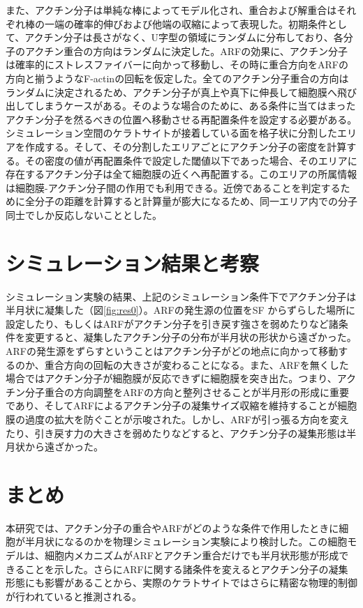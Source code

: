 \documentclass[10pt,twocolumn,a4j]{jarticle}
\begin{document}
また、アクチン分子は単純な棒によってモデル化され、重合および解重合はそれぞれ棒の一端の確率的伸びおよび他端の収縮によって表現した。初期条件として、アクチン分子は長さがなく、U字型の領域にランダムに分布しており、各分子のアクチン重合の方向はランダムに決定した。ARFの効果に、アクチン分子は確率的にストレスファイバーに向かって移動し、その時に重合方向をARFの方向と揃うようなF-actinの回転を仮定した。全てのアクチン分子重合の方向はランダムに決定されるため、アクチン分子が真上や真下に伸長して細胞膜へ飛び出してしまうケースがある。そのような場合のために、ある条件に当てはまったアクチン分子を然るべきの位置へ移動させる再配置条件を設定する必要がある。シミュレーション空間のケラトサイトが接着している面を格子状に分割したエリアを作成する。そして、その分割したエリアごとにアクチン分子の密度を計算する。その密度の値が再配置条件で設定した閾値以下であった場合、そのエリアに存在するアクチン分子は全て細胞膜の近くへ再配置する。このエリアの所属情報は細胞膜-アクチン分子間の作用でも利用できる。近傍であることを判定するために全分子の距離を計算すると計算量が膨大になるため、同一エリア内での分子同士でしか反応しないこととした。
\section{シミュレーション結果と考察}
シミュレーション実験の結果、上記のシミュレーション条件下でアクチン分子は半月状に凝集した（図\ref{fig:res0}）。ARFの発生源の位置をSF からずらした場所に設定したり、もしくはARFがアクチン分子を引き戻す強さを弱めたりなど諸条件を変更すると、凝集したアクチン分子の分布が半月状の形状から遠ざかった。ARFの発生源をずらすということはアクチン分子がどの地点に向かって移動するのか、重合方向の回転の大きさが変わることになる。また、ARFを無くした場合ではアクチン分子が細胞膜が反応できずに細胞膜を突き出た。つまり、アクチン分子重合の方向調整をARFの方向と整列させることが半月形の形成に重要であり、そしてARFによるアクチン分子の凝集サイズ収縮を維持することが細胞膜の過度の拡大を防ぐことが示唆された。しかし、ARFが引っ張る方向を変えたり、引き戻す力の大きさを弱めたりなどすると、アクチン分子の凝集形態は半月状から遠ざかった。
\section{まとめ}
本研究では、アクチン分子の重合やARFがどのような条件で作用したときに細胞が半月状になるのかを物理シミュレーション実験により検討した。この細胞モデルは、細胞内メカニズムがARFとアクチン重合だけでも半月状形態が形成できることを示した。さらにARFに関する諸条件を変えるとアクチン分子の凝集形態にも影響があることから、実際のケラトサイトではさらに精密な物理的制御が行われていると推測される。



\end{document}
